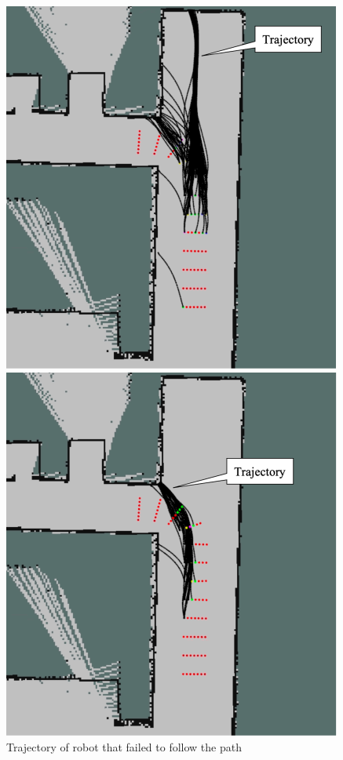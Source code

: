 \documentclass{jarticle}
\begin{document}
\vspace*{-2.5mm}
\begin{figure}[htbp]
  \begin{minipage}[t]{0.5\linewidth}
    \centering
    \includegraphics[keepaspectratio, scale=0.2]{figs/c.png}
  \end{minipage}
  \begin{minipage}[t]{0.5\linewidth}
    \centering
    \includegraphics[keepaspectratio, scale=0.2]{figs/d.png}
  \end{minipage}\vspace*{2mm}
  \caption{Trajectory of robot that failed to follow the path}
\end{figure}
\end{document}
